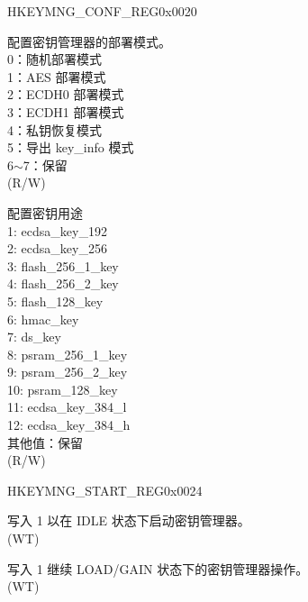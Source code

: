 \begin{register}{H}{KEYMNG\_CONF\_REG}{0x0020}\label{regdesc:KEYMNGCONFREG}
%
%
%
\regnewline%
\begin{regdesc}\begin{reglist}
\label{fielddesc:KEYMNGKGENMODE}\item [KEYMNG\_KGEN\_MODE] 配置密钥管理器的部署模式。 \\
0：随机部署模式\\
1：AES 部署模式\\
2：ECDH0 部署模式\\
3：ECDH1 部署模式\\
4：私钥恢复模式\\
5：导出 key\_info 模式\\
6$\sim$7：保留\\
(R/W)
\label{fielddesc:KEYMNGKEYPURPOSE}\item [KEYMNG\_KEY\_PURPOSE] 配置密钥用途 \\
1: ecdsa\_key\_192 \\
2: ecdsa\_key\_256 \\
3: flash\_256\_1\_key \\
4: flash\_256\_2\_key \\
5: flash\_128\_key \\
6: hmac\_key \\
7: ds\_key \\
8: psram\_256\_1\_key \\
9: psram\_256\_2\_key \\
10: psram\_128\_key \\
11: ecdsa\_key\_384\_l \\
12: ecdsa\_key\_384\_h \\
其他值：保留\\
(R/W)
\end{reglist}\end{regdesc}
\end{register}


\begin{register}{H}{KEYMNG\_START\_REG}{0x0024}\label{regdesc:KEYMNGSTARTREG}
%
%
%
\regnewline%
\begin{regdesc}\begin{reglist}
\label{fielddesc:KEYMNGSTART}\item [KEYMNG\_START] 写入 1 以在 IDLE 状态下启动密钥管理器。\\
(WT)
\label{fielddesc:KEYMNGCONTINUE}\item [KEYMNG\_CONTINUE] 写入 1 继续 LOAD/GAIN 状态下的密钥管理器操作。\\
(WT)
\end{reglist}\end{regdesc}
\end{register}


